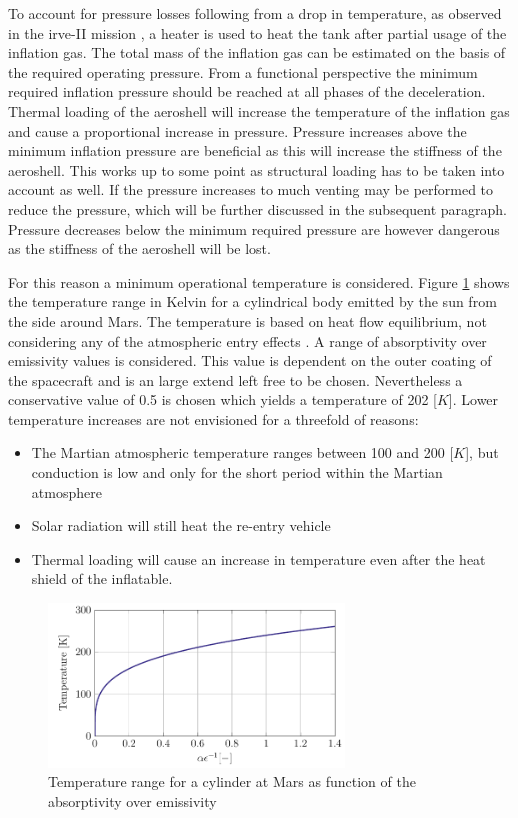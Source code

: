 To account for pressure losses following from a drop in temperature, as observed in the \gls{irve}-II mission \cite{Dillman2012}, a heater is used to heat the tank after partial usage of the inflation gas. The total mass of the inflation gas can be estimated on the basis of the required operating pressure. From a functional perspective the minimum required inflation pressure should be reached at all phases of the deceleration. Thermal loading of the aeroshell will increase the temperature of the inflation gas and cause a proportional increase in pressure. Pressure increases above the minimum inflation pressure are beneficial as this will increase the stiffness of the aeroshell. This works up to some point as structural loading has to be taken into account as well. If the pressure increases to much venting may be performed to reduce the pressure, which will be further discussed in the subsequent paragraph. Pressure decreases below the minimum required pressure are however dangerous as the stiffness of the aeroshell will be lost.

For this reason a minimum operational temperature is considered. Figure \ref{fig:tanktemp} shows the temperature range in Kelvin for a cylindrical body emitted by the sun from the side around Mars. The temperature is based on heat flow equilibrium, not considering any of the atmospheric entry effects \cite{Wertz2011}. A range of absorptivity over emissivity values is considered. This value is dependent on the outer coating of the spacecraft and is an large extend left free to be chosen. Nevertheless a conservative value of 0.5 is chosen which yields a temperature of 202 [$K$]. Lower temperature increases are not envisioned for a threefold of reasons:

\begin{itemize}
\item The Martian atmospheric temperature ranges between 100 and 200 [$K$], but conduction is low and only for the short period within the Martian atmosphere
\item Solar radiation will still heat the re-entry vehicle
\item Thermal loading will cause an increase in temperature even after the heat shield of the inflatable.
\end{itemize}

\begin{figure}[h]
		\centering
		\includegraphics[width=0.7\textwidth]{./Figure/Structure/Temp.pdf}
		\caption{Temperature range for a cylinder at Mars as function of the absorptivity over emissivity}
		\label{fig:tanktemp}
\end{figure}

